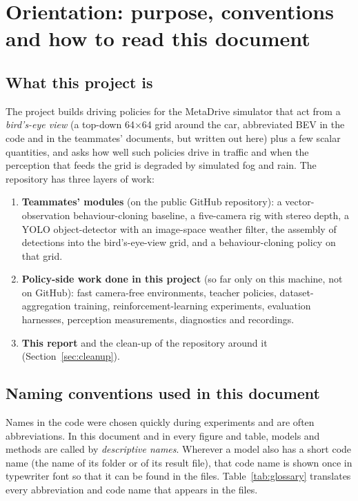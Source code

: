 \section{Orientation: purpose, conventions and how to read this document}

\subsection{What this project is}
The project builds driving policies for the MetaDrive simulator that act from a \emph{bird's-eye view} (a top-down 64$\times$64 grid around the car, abbreviated BEV in the
code and in the teammates' documents, but written out here) plus a few scalar quantities, and asks how well such policies drive in traffic and when the
perception that feeds the grid is degraded by simulated fog and rain. The repository has three layers of work:
\begin{enumerate}
\item \textbf{Teammates' modules} (on the public GitHub repository): a vector-observation behaviour-cloning baseline, a five-camera rig with stereo depth, a YOLO object-detector with
  an image-space weather filter, the assembly of detections into the bird's-eye-view grid, and a behaviour-cloning policy on that grid.
\item \textbf{Policy-side work done in this project} (so far only on this machine, not on GitHub): fast camera-free environments, teacher policies, dataset-aggregation training,
  reinforcement-learning experiments, evaluation harnesses, perception measurements, diagnostics and recordings.
\item \textbf{This report} and the clean-up of the repository around it (Section~\ref{sec:cleanup}).
\end{enumerate}

\subsection{Naming conventions used in this document}
Names in the code were chosen quickly during experiments and are often abbreviations. In this document and in every figure and table, models and methods are
called by \emph{descriptive names}. Wherever a model also has a short code name (the name of its folder or of its result file), that code name is shown
once in typewriter font so that it can be found in the files. Table~\ref{tab:glossary} translates every abbreviation and code name that appears in the files.

